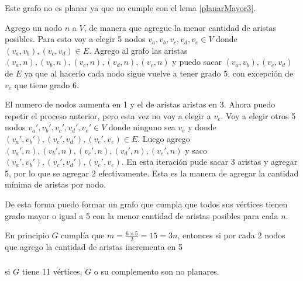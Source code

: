 Este grafo no es planar ya que no cumple con el lema \ref{planarMayor3}.

Agrego un nodo $n$ a $V$, de manera que agregue la menor cantidad de aristas posibles. Para esto voy a elegir 5 nodos $v_a, v_b, v_c, v_d, v_e \in V$ donde $(v_a, v_b), (v_c, v_d) \in E$. Agrego al grafo las aristas $(v_a, n), (v_b, n), (v_c, n), (v_d, n), (v_e, n)$ y puedo sacar $(v_a, v_b), (v_c, v_d)$ de $E$ ya que al hacerlo cada nodo sigue vuelve a tener grado 5, con excepción de $v_e$ que tiene grado 6.

El numero de nodos aumenta en 1 y el de aristas aristas en 3. Ahora puedo repetir el proceso anterior, pero esta vez no voy a elegir a $v_e$. Voy a elegir otros 5 nodos $v_a', v_b', v_c', v_d', v_e' \in V$ donde ninguno sea $v_e$ y donde $(v_a', v_b'), (v_c', v_d'), (v_e', v_e) \in E$. Luego agrego $(v_a', n), (v_b', n), (v_c', n), (v_d', n), (v_e', n)$ y saco $(v_a', v_b'), (v_c', v_d'), (v_e', v_e)$. En esta iteración pude sacar 3 aristas y agregar 5, por lo que se agregar 2 efectivamente. Esta es la manera de agregar la cantidad mínima de aristas por nodo.

De esta forma puedo formar un grafo que cumpla que todos sus vértices tienen grado mayor o igual a 5 con la menor cantidad de aristas posibles para cada $n$.

En principio $G$ cumplía que $m = \frac{6 \times 5}{2} = 15 = 3n$, entonces si por cada 2 nodos que agrego la cantidad de aristas incrementa en 5

\subsubsection{}

\begin{lema}
	si $G$ tiene 11 vértices, $G$ o su complemento son no planares.
\end{lema}


